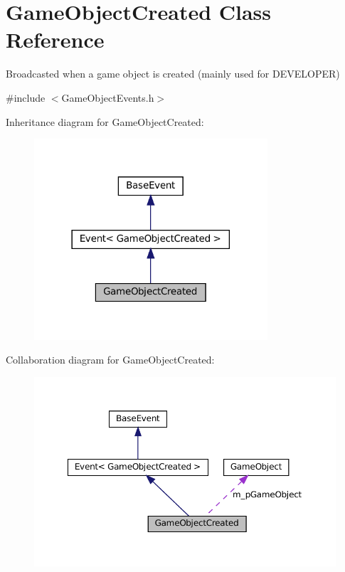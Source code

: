 \hypertarget{classGameObjectCreated}{}\section{Game\+Object\+Created Class Reference}
\label{classGameObjectCreated}


Broadcasted when a game object is created (mainly used for D\+E\+V\+E\+L\+O\+P\+ER)  




{\ttfamily \#include $<$Game\+Object\+Events.\+h$>$}



Inheritance diagram for Game\+Object\+Created\+:\nopagebreak
\begin{figure}[H]
\begin{center}
\leavevmode
\includegraphics[width=246pt]{classGameObjectCreated__inherit__graph}
\end{center}
\end{figure}


Collaboration diagram for Game\+Object\+Created\+:\nopagebreak
\begin{figure}[H]
\begin{center}
\leavevmode
\includegraphics[width=350pt]{classGameObjectCreated__coll__graph}
\end{center}
\end{figure}
